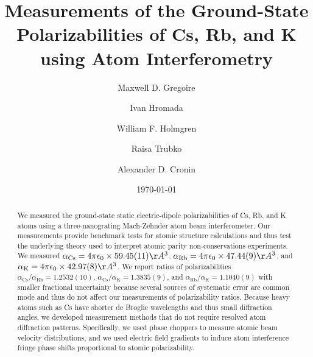 \documentclass[twocolumn,prl,showpacs,superscriptaddress]{revtex4-1}   %
\newcommand{\ak}{\alpha_{\textrm{K}}}
\newcommand{\arb}{\alpha_{\textrm{Rb}}}
\newcommand{\acs}{\alpha_{\textrm{Cs}}}
\newcommand{\polKSysOnly}{42.97(8)}
\newcommand{\polRbSysOnly}{47.44(9)}
\newcommand{\polCsSysOnly}{59.45(11)}
\newcommand{\ratRbK}{1.1040(9)}
\newcommand{\ratCsK}{1.3835(9)}
\newcommand{\ratCsRb}{1.2532(10)}
\begin{document}
\title{Measurements of the Ground-State Polarizabilities of Cs, Rb, and K using Atom Interferometry}

\author{Maxwell D. Gregoire}
\author{Ivan Hromada}
\author{William F. Holmgren}
\author{Raisa Trubko}
\author{Alexander D. Cronin}

\date{\today}





\begin{abstract}
We measured the ground-state static electric-dipole polarizabilities of Cs, Rb, and K atoms using a three-nanograting Mach-Zehnder atom beam interferometer.  Our measurements provide benchmark tests for atomic structure calculations and thus test the underlying theory used to interpret atomic parity non-conservations experiments.  We measured $\acs = 4\pi\epsilon_0 \times \polCsSysOnly \AA^3$, $\arb = 4\pi\epsilon_0 \times \polRbSysOnly \AA^3$, and $\ak = 4\pi\epsilon_0 \times \polKSysOnly \AA^3$.   We report ratios of polarizabilities $\acs/\arb = \ratCsRb$, $\acs/\ak = \ratCsK$, and $\arb/\ak = \ratRbK$ with smaller fractional uncertainty because several sources of systematic error are common mode and thus do not affect our measurements of polarizability ratios.  Because heavy atoms such as Cs have shorter de Broglie wavelengths and thus small diffraction angles, we developed measurement methods that do not require resolved atom diffraction patterns. Specifically, we used phase choppers to measure atomic beam velocity distributions, and we used electric field gradients to induce atom interference fringe phase shifts proportional to atomic polarizability.
\end{abstract}
\end{document}
